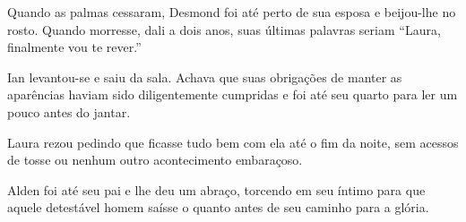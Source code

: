 Quando as palmas cessaram, Desmond foi até perto de sua esposa e beijou-lhe no
rosto. Quando morresse, dali a dois anos, suas últimas palavras seriam “Laura,
finalmente vou te rever.”

Ian levantou-se e saiu da sala. Achava que suas obrigações de manter as
aparências haviam sido diligentemente cumpridas e foi até seu quarto para ler
um pouco antes do jantar.

Laura rezou pedindo que ficasse tudo bem com ela até o fim da noite, sem
acessos de tosse ou nenhum outro acontecimento embaraçoso.

Alden foi até seu pai e lhe deu um abraço, torcendo em seu íntimo para que
aquele detestável homem saísse o quanto antes de seu caminho para a glória.
